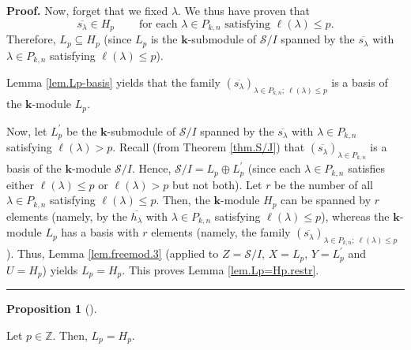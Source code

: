 \documentclass[numbers=enddot,12pt,final,onecolumn,notitlepage]{scrartcl}%
\theoremstyle{definition}
\newtheorem{prop}[theo]{Proposition}
\newenvironment{proposition}[1][]
{\begin{prop}[#1]\begin{leftbar}}
{\end{leftbar}\end{prop}}
\newenvironment{proof}[1][Proof]{\noindent\textbf{#1.} }{\ \rule{0.5em}{0.5em}}
\begin{document}
\begin{proof}
Now, forget that we fixed $\lambda$. We thus have proven that%
\[
\overline{s_{\lambda}}\in H_{p}\ \ \ \ \ \ \ \ \ \ \text{for each }\lambda\in
P_{k,n}\text{ satisfying }\ell\left(  \lambda\right)  \leq p\text{.}%
\]
Therefore, $L_{p}\subseteq H_{p}$ (since $L_{p}$ is the $\mathbf{k}$-submodule
of $\mathcal{S}/I$ spanned by the $\overline{s_{\lambda}}$ with $\lambda\in
P_{k,n}$ satisfying $\ell\left(  \lambda\right)  \leq p$).

Lemma \ref{lem.Lp-basis} yields that the family $\left(  \overline{s_{\lambda
}}\right)  _{\lambda\in P_{k,n};\ \ell\left(  \lambda\right)  \leq p}$ is a
basis of the $\mathbf{k}$-module $L_{p}$.

Now, let $L_{p}^{\prime}$ be the $\mathbf{k}$-submodule of $\mathcal{S}/I$
spanned by the $\overline{s_{\lambda}}$ with $\lambda\in P_{k,n}$ satisfying
$\ell\left(  \lambda\right)  >p$. Recall (from Theorem \ref{thm.S/J}) that
$\left(  \overline{s_{\lambda}}\right)  _{\lambda\in P_{k,n}}$ is a basis of
the $\mathbf{k}$-module $\mathcal{S}/I$. Hence, $\mathcal{S}/I=L_{p}\oplus
L_{p}^{\prime}$ (since each $\lambda\in P_{k,n}$ satisfies either $\ell\left(
\lambda\right)  \leq p$ or $\ell\left(  \lambda\right)  >p$ but not both). Let
$r$ be the number of all $\lambda\in P_{k,n}$ satisfying $\ell\left(
\lambda\right)  \leq p$. Then, the $\mathbf{k}$-module $H_{p}$ can be spanned
by $r$ elements (namely, by the $\overline{h_{\lambda}}$ with $\lambda\in
P_{k,n}$ satisfying $\ell\left(  \lambda\right)  \leq p$), whereas the
$\mathbf{k}$-module $L_{p}$ has a basis with $r$ elements (namely, the family
$\left(  \overline{s_{\lambda}}\right)  _{\lambda\in P_{k,n};\ \ell\left(
\lambda\right)  \leq p}$). Thus, Lemma \ref{lem.freemod.3} (applied to
$Z=\mathcal{S}/I$, $X=L_{p}$, $Y=L_{p}^{\prime}$ and $U=H_{p}$) yields
$L_{p}=H_{p}$. This proves Lemma \ref{lem.Lp=Hp.restr}.
\end{proof}

\begin{proposition}
\label{prop.Lp=Hp}Let $p\in\mathbb{Z}$. Then, $L_{p}=H_{p}$.
\end{proposition}
\end{document}
